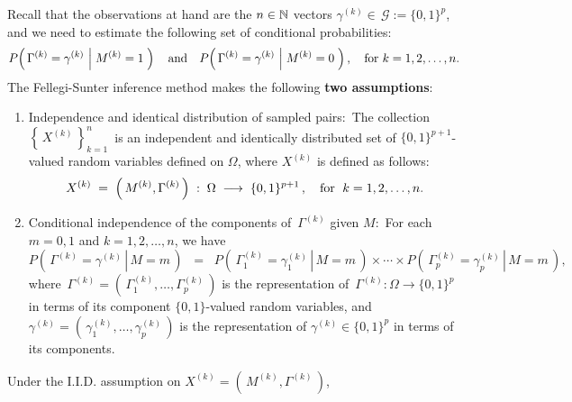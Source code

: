\vskip 0.5cm
\begin{remark}
\mbox{}\vskip 0.05cm
\noindent
Recall that the observations at hand are the $n \in \mathbb{N}$ vectors $\gamma^{(k)} \in \, \mathcal{G} := \{0,1\}^{p}$, and
we need to estimate the following set of conditional probabilities:
\begin{equation*}
P\!\left(\,
	\Gamma^{(k)}=\gamma^{(k)}\,
	\left\vert\;M^{(k)} = \overset{{\color{white}.}}{1}\right.
	\,\right)
\quad\textnormal{and}\quad
P\!\left(\,
	\Gamma^{(k)}=\gamma^{(k)}\,
	\left\vert\;M^{(k)} = \overset{{\color{white}.}}{0}\right.
	\,\right),
\quad
\textnormal{for $k = 1,2,\ldots,n$}.
\end{equation*}
The Fellegi-Sunter inference method makes the following \textbf{two assumptions}:
\begin{enumerate}
\item
	Independence and identical distribution of sampled pairs:\,
	The collection \,$\left\{\,X^{(k)}\,\right\}_{k=1}^{n}$\, is an
	independent and identically distributed set of $\{0,1\}^{p+1}$-valued
	random variables defined on $\Omega$, where $X^{(k)}$ is defined as follows:
	\begin{equation*}
	X^{(k)} \;=\; \left(\,M^{(k)},\Gamma^{(k)}\,\right) \;:\; \Omega \;\longrightarrow \; \{0,1\}^{p+1}\,,
	\quad
	\textnormal{for \;$k = 1,2,\ldots,n$}.
	\end{equation*}
\item
	Conditional independence of the components of \,$\Gamma^{(k)}$ given $M$:\,
	For each $m = 0,1$ and $k = 1,2,\ldots,n$, we have
	\begin{equation*}
	P\!\left(\,\left.\Gamma^{(k)} = \gamma^{(k)} \,\right\vert\, M = m\,\right)
	\;\; = \;\;
	P\!\left(\,\left.\Gamma^{(k)}_{1} = \gamma^{(k)}_{1} \,\right\vert\, M = m\,\right)
	\times \cdots \times
	P\!\left(\,\left.\Gamma^{(k)}_{p} = \gamma^{(k)}_{p} \,\right\vert\, M = m\,\right),
	\end{equation*}
	where \,$\Gamma^{(k)} = \left(\,\Gamma^{(k)}_{1},\ldots,\Gamma^{(k)}_{p}\,\right)$
	is the representation of \,$\Gamma^{(k)} : \Omega \longrightarrow \{0,1\}^{p}$
	in terms of its component $\{0,1\}$-valued random variables, and
	\,$\gamma^{(k)} = \left(\,\gamma^{(k)}_{1},\ldots,\gamma^{(k)}_{p}\,\right)$
	is the representation of $\gamma^{(k)} \in \{0,1\}^{p}$ in terms of its components.
\end{enumerate}
Under the I.I.D. assumption on $X^{(k)} = \left(\,M^{(k)},\Gamma^{(k)}\,\right)$,

\end{remark}
